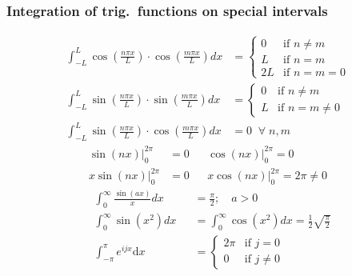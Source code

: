 \subsubsection{Integration of trig.\ functions on special intervals}
\noindent
\begin{align*}
    \int_{-L}^L \cos\left(\frac{n\pi x}{L}\right)\cdot \cos\left(\frac{m\pi x}{L}\right) dx & =\begin{cases}
                                                                                                   0  & \text{if } n\neq m \\
                                                                                                   L  & \text{if } n=m     \\
                                                                                                   2L & \text{if } n=m=0
                                                                                               \end{cases}  \\
    \int_{-L}^L \sin\left(\frac{n\pi x}{L}\right)\cdot \sin\left(\frac{m\pi x}{L}\right) dx & =\begin{cases}
                                                                                                   0 & \text{if }n\neq m    \\
                                                                                                   L & \text{if } n=m\neq 0
                                                                                               \end{cases} \\
    \int_{-L}^L \sin\left(\frac{n\pi x}{L}\right)\cdot \cos\left(\frac{m\pi x}{L}\right) dx & =0\;\;\forall\; n,m
\end{align*}
\begin{align*}
    \sin(nx)\Big|_0^{2\pi}  & =0 &  & \cos(nx)\Big|_0^{2\pi}=0          \\
    x\sin(nx)\Big|_0^{2\pi} & =0 &  & x\cos(nx)\Big|_0^{2\pi}=2\pi\neq0
\end{align*}
\begin{align*}
     & \int_0^{\infty} \frac{\sin(ax)}{x} dx &  & =\frac{\pi}{2};\quad a>0                                                 \\
     & \int_0^{\infty} \sin(x^2) dx          &  & =\int_0^{\infty}\cos(x^2)dx=\frac{1}{2}\sqrt{\frac{\pi}{2}}              \\
     & \int_{-\pi}^{\pi} e^{ijx} \text{d}x   &  & = \begin{cases}2\pi & \text{if } j=0\\ 0 & \text{if } j\neq 0\end{cases}
\end{align*}


